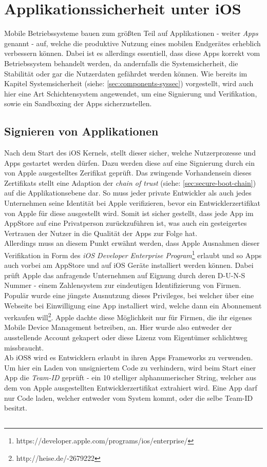 \section{Applikationssicherheit unter iOS}
	Mobile Betriebssysteme bauen zum größten Teil auf Applikationen - weiter
	\textsl{Apps} genannt - auf, welche die produktive Nutzung eines mobilen
	Endgerätes erheblich verbessern können. Dabei ist es allerdings
	essentiell, dass diese Apps korrekt vom Betriebssystem behandelt werden, da
	andernfalls die Systemsicherheit, die Stabilität oder gar die Nutzerdaten
	gefährdet werden können. Wie bereits im Kapitel Systemsicherheit (siehe:
	\ref{sec:components-syssec}) vorgestellt, wird auch hier eine Art
	Schichtensystem angewendet, um eine Signierung und Verifikation, sowie ein
	Sandboxing der Apps sicherzustellen.
	\subsection{Signieren von Applikationen}
		Nach dem Start des iOS Kernels, stellt dieser sicher, welche Nutzerprozesse
		und Apps gestartet werden dürfen. Dazu werden diese auf eine Signierung durch
		ein von Apple ausgestelltes Zerifikat geprüft. Das zwingende Vorhandensein
		dieses Zertifikats stellt eine Adaption der \textsl{chain of trust} (siehe:
		\ref{sec:secure-boot-chain}) auf die Applikationsebene dar. So muss jeder
		private Entwickler als auch jedes Unternehmen seine Identität bei Apple
		verifizieren, bevor ein Entwicklerzertifikat von Apple für diese ausgestellt
		wird. Somit ist sicher gestellt, dass jede App im AppStore auf eine
		Privatperson zurückzuführen ist, was auch ein gesteigertes Vertrauen der
		Nutzer in die Qualität der Apps zur Folge hat.\\
		Allerdings muss an diesem Punkt erwähnt werden, dass Apple Ausnahmen dieser
		Verifikation in Form des \textsl{iOS Developer Enterprise
		Program}\footnote{https://developer.apple.com/programs/ios/enterprise/}
		erlaubt und so Apps auch vorbei am AppStore und auf iOS Geräte installiert
		werden können. Dabei prüft Apple das anfragende Unternehmen auf Eignung durch
		deren D-U-N-S Nummer - einem Zahlensystem zur eindeutigen Identifizierung von
		Firmen. Populär wurde eine jüngste Ausnutzung dieses Privileges, bei welcher
		über eine Webseite bei Einwilligung eine App installiert wird, welche dann
		ein Abonnement verkaufen will\footnote{http://heise.de/-2679222}. Apple
		dachte diese Möglichkeit nur für Firmen, die ihr eigenes Mobile Device
		Management betreiben, an. Hier wurde also entweder der ausstellende Account
		gekapert oder diese Lizenz vom Eigentümer schlichtweg missbraucht.\\
		Ab iOS8 wird es Entwicklern erlaubt in ihren Apps Frameworks zu verwenden. Um
		hier ein Laden von unsigniertem Code zu verhindern, wird beim Start einer App
		die \textsl{Team-ID} geprüft - ein 10 stelliger alphanumerischer String,
		welcher aus dem von Apple ausgestellten Entwicklerzertifikat extrahiert wird.
		Eine App darf nur Code laden, welcher entweder vom System kommt, oder die selbe
		Team-ID besitzt.
	\subsection{}